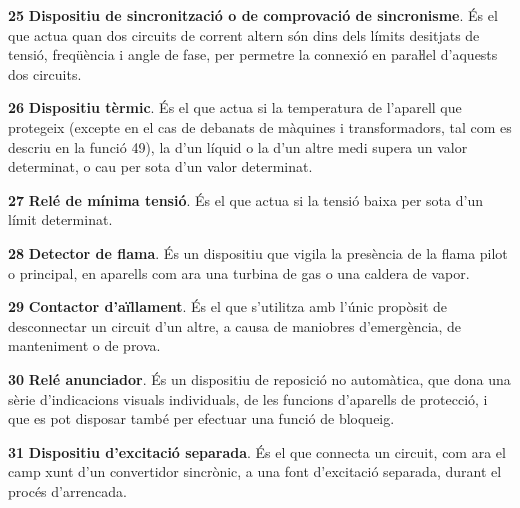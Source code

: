 \begin{multicols}{2}
\begin{list}{}
\item[\textbf{25}]   
\textbf{Dispositiu de sincronització o de comprovació de sincronisme}. És el que actua quan dos circuits de corrent altern
són dins dels límits desitjats de tensió, freqüència i angle de
fase, per permetre la connexió en paraŀlel d'aquests dos circuits.


\item[\textbf{26}]    
\textbf{Dispositiu tèrmic}. És el que
actua si la temperatura de l'aparell que protegeix (excepte en el cas de debanats de màquines i transformadors, tal com es descriu en la funció 49), la d'un líquid o la d'un altre medi  supera un valor
determinat, o cau per sota d'un valor determinat.


\item[\textbf{27}]   
\textbf{Relé de mínima tensió}. És el que
actua si la tensió baixa per sota d'un límit determinat.

\item[\textbf{28}]   
\textbf{Detector de flama}. És un dispositiu que vigila la presència de la flama pilot o principal, en aparells  com ara una turbina de gas o una caldera  de vapor.

\item[\textbf{29}]  
\textbf{Contactor d'aïllament}. És el que
s'utilitza amb l'únic propòsit de desconnectar un circuit d'un
altre,  a  causa de maniobres    d'emergència,  de manteniment o de
prova.

\item[\textbf{30}]  
 \textbf{Relé anunciador}. És un dispositiu de
reposició no automàtica, que dona una sèrie d'indicacions visuals
individuals, de les funcions d'aparells de protecció, i que es pot
disposar també per efectuar una funció de bloqueig.

\item[\textbf{31}]  
\textbf{Dispositiu d'excitació separada}. És el que connecta un circuit, com ara el camp xunt
d'un convertidor sincrònic, a una font d'excitació separada, durant el procés
d'arrencada.


\end{list}
\end{multicols}
